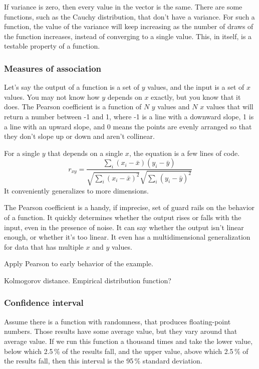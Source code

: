 \documentclass[fleqn,10pt]{olplainarticle}
\begin{document}
If variance is zero, then every value in the vector is
the same. There are some functions, such as the Cauchy
distribution, that don't have a variance. For such a function,
the value of the variance will keep increasing as the
number of draws of the function increases, instead of
converging to a single value. This, in itself, is a
testable property of a function.

\subsubsection{Measures of association}

Let's say the output of a function is a set of $y$ values,
and the input is a set of $x$ values. You may not know
how $y$ depends on $x$ exactly, but you know that it
does. The Pearson coefficient is a function of
$N$ $y$ values and $N$ $x$ values that will return a number
between -1 and 1, where -1 is a line with a downward slope,
1 is a line with an upward slope, and 0 means the points
are evenly arranged so that they don't slope up or down
and aren't collinear.

For a single $y$ that depends on a single $x$, the equation
is a few lines of code.
\begin{equation}
r_{xy} = \frac{\sum_i (x_i - \bar{x})(y_i - \bar{y})}{\sqrt{\sum_i (x_i - \bar{x})^2}\sqrt{\sum_i(y_i - \bar{y})^2}}
\end{equation}
It conveniently generalizes to more dimensions.

The Pearson coefficient is a handy, if imprecise,
set of guard rails on the behavior of a function.
It quickly determines whether the output rises or falls with the input,
even in the presence of noise. It can say whether the output
isn't linear enough, or whether it's too linear.
It even has a multidimensional generalization for data that
has multiple $x$ and $y$ values.

Apply Pearson to early behavior of the example.

Kolmogorov distance. Empirical distribution function?


\subsubsection{Confidence interval}

Assume there is a function with randomness, that produces floating-point numbers. Those results
have some average value, but they vary around that average value.
If we run this function a thousand times and take the
lower value, below which 2.5\,\% of the results fall,
and the upper value, above which 2.5\,\% of the results fall,
then this interval is the 95\,\% standard deviation.
\end{document}
